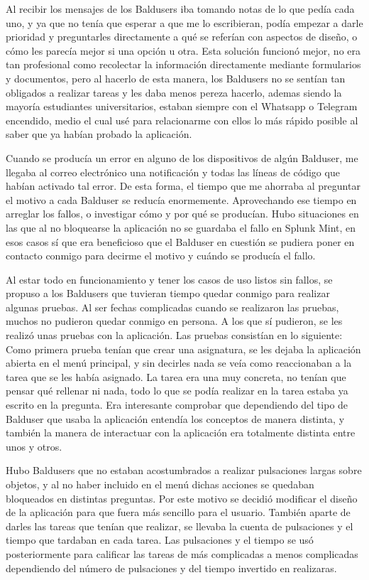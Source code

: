 Al recibir los mensajes de los Baldusers iba tomando notas de lo que pedía cada uno, y ya que no tenía que esperar a que me lo escribieran, podía empezar a darle prioridad y preguntarles directamente a qué se referían con aspectos de diseño, o cómo les parecía mejor si una opción u otra.
Esta solución funcionó mejor, no era tan profesional como recolectar la información directamente mediante formularios y documentos, pero al hacerlo de esta manera, los Baldusers no  se sentían tan obligados a realizar tareas y les daba menos pereza hacerlo, ademas siendo la mayoría estudiantes universitarios, estaban siempre con el Whatsapp o Telegram encendido, medio el cual usé para relacionarme con ellos lo más rápido posible al saber que ya habían probado la aplicación.

Cuando se producía un error en alguno de los dispositivos de algún Balduser, me llegaba al correo electrónico una notificación y todas las líneas de código que habían activado tal error.
De esta forma, el tiempo que me ahorraba al preguntar el motivo a cada Balduser se reducía enormemente.
Aprovechando ese tiempo en arreglar los fallos, o investigar cómo y por qué se producían.
Hubo situaciones en las que al no bloquearse la aplicación no se guardaba el fallo en Splunk Mint\cite{SplunkMint}, en esos casos sí que era beneficioso que el Balduser en cuestión se pudiera poner en contacto conmigo para decirme el motivo y cuándo se producía el fallo.

Al estar todo en funcionamiento y tener los casos de uso listos sin fallos, se propuso a los Baldusers que tuvieran tiempo quedar conmigo para realizar algunas pruebas.
Al ser fechas complicadas cuando se realizaron las pruebas, muchos no pudieron quedar conmigo en persona. A los que sí pudieron, se les realizó unas pruebas con la aplicación. Las pruebas consistían en lo siguiente:
Como primera prueba tenían que crear una asignatura, se les dejaba la aplicación abierta en el menú principal, y sin decirles nada se veía como reaccionaban a la tarea que se les había asignado. La tarea era una muy concreta, no tenían que pensar qué rellenar ni nada, todo lo que se podía realizar en la tarea estaba ya escrito en la pregunta.
Era interesante comprobar que dependiendo del tipo de Balduser que usaba la aplicación entendía los conceptos de manera distinta, y también la manera de interactuar con la aplicación era totalmente distinta entre unos y otros.

Hubo Baldusers que no estaban acostumbrados a realizar pulsaciones largas sobre objetos, y al no haber incluido en el menú dichas acciones se quedaban bloqueados en distintas preguntas.
Por este motivo se decidió modificar el diseño de la aplicación para que fuera más sencillo para el usuario.
También aparte de darles las tareas que tenían que realizar, se llevaba la cuenta de pulsaciones y el tiempo que tardaban en cada tarea.
Las pulsaciones y el tiempo se usó posteriormente para calificar las tareas de más complicadas a menos complicadas dependiendo del número de pulsaciones y del tiempo invertido en realizaras.

